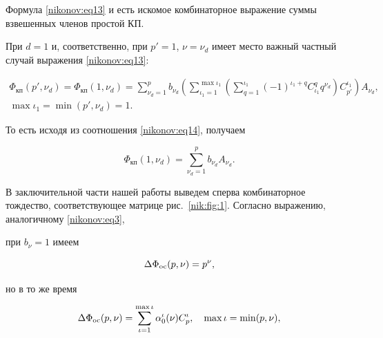 Формула \eqref{nikonov:eq13} и есть искомое комбинаторное выражение суммы взвешенных членов простой КП.



При $d=1$ и, соответственно, при $p'=1$, $\nu=\nu_d$ имеет место важный частный случай выражения \eqref{nikonov:eq13}:

\begin{equation}

\label{nikonov:eq14}

\begin{array}{c}

\displaystyle

\Phi_{\text{кп}} (p',\nu_d)= \Phi_{\text{кп}} (1,\nu_d)

=\sum \limits_{\nu_d=1}^p b_{\nu_d} \left(\sum \limits_{\iota_1=1}^{\max \iota_1}

\left(\sum \limits_{q=1}^{\iota_1} (-1)^{\iota_1+q}C^q_{\iota_1} q^{\nu_d}\right)C^{\iota_1}_{p'}  \right) A_{\nu_d}, \\

\max \iota_1=\min \left(p',\nu_d \right)=1.

\end{array}

\end{equation}



То есть исходя из соотношения \eqref{nikonov:eq14}, получаем

$$

\Phi_{\text{кп}}(1,\nu_d)=\sum \limits_{\nu_d=1}^p b_{\nu_d} A_{\nu_d}.

$$



В заключительной части нашей работы выведем сперва комбинаторное тождество, соответствующее матрице рис.~\ref{nik:fig:1}. Согласно выражению, аналогичному \eqref{nikonov:eq3},

при $b_\nu=1$ имеем

\begin{equation}

\label{nikonov:eq15}

\Delta \Phi_{\rm oc} (p,\nu)=p^\nu,

\end{equation}

но в то же время

\begin{equation}

\label{nikonov:eq16}

\Delta \Phi_{\rm oc} (p,\nu)= \sum \limits_{\iota=1}^{\max \iota} \alpha_0^\iota (\nu)  C^\iota_p, \quad \max \iota=\min (p,\nu),

\end{equation}

